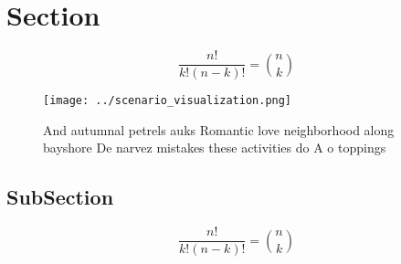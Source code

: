 \documentclass[a4paper]{article}
\begin{document}
\section{Section}

\[ \frac{n!}{k!(n-k)!} = \binom{n}{k} \]

\begin{figure}
\centering
\texttt{[image: ../scenario\_visualization.png]}
\caption{And autumnal petrels auks Romantic love neighborhood along bayshore De narvez mistakes these activities do A o toppings
}
\end{figure}
 
\subsection{SubSection}

\[ \frac{n!}{k!(n-k)!} = \binom{n}{k} \]
\end{document}
